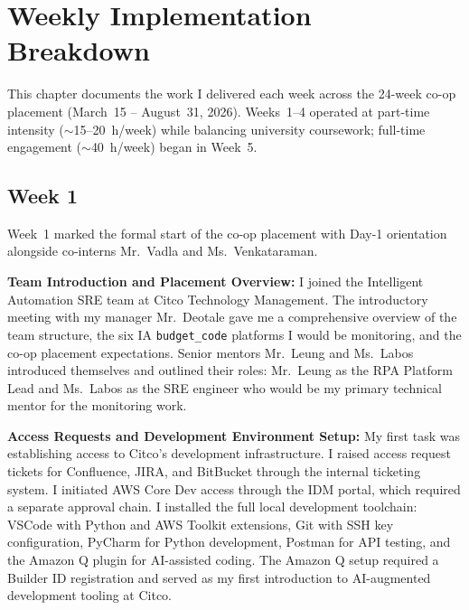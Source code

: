 ﻿%

\chapter{Weekly Implementation Breakdown}
\label{chap:weekly_breakdown}

This chapter documents the work I delivered each week across the 24-week
co-op placement (March~15 -- August~31, 2026). Weeks~1--4 operated at part-time
intensity ($\sim$15--20~h/week) while balancing university coursework;
full-time engagement ($\sim$40~h/week) began in Week~5.


\FloatBarrier

\section{Week 1}
\label{sec:week1}

Week~1 marked the formal start of the co-op placement with Day-1 orientation alongside co-interns Mr.\ Vadla and Ms.\ Venkataraman.

\textbf{Team Introduction and Placement Overview:}
I joined the Intelligent Automation SRE team at Citco Technology Management. The introductory meeting with my manager Mr.\ Deotale gave me a comprehensive overview of the team structure, the six IA \texttt{budget\_code} platforms I would be monitoring, and the co-op placement expectations. Senior mentors Mr.\ Leung and Ms.\ Labos introduced themselves and outlined their roles: Mr.\ Leung as the RPA Platform Lead and Ms.\ Labos as the SRE engineer who would be my primary technical mentor for the monitoring work.

\textbf{Access Requests and Development Environment Setup:}
My first task was establishing access to Citco's development infrastructure. I raised access request tickets for Confluence, JIRA, and BitBucket through the internal ticketing system. I initiated AWS Core Dev access through the IDM portal, which required a separate approval chain. I installed the full local development toolchain: VSCode with Python and AWS Toolkit extensions, Git with SSH key configuration, PyCharm for Python development, Postman for API testing, and the Amazon Q plugin for AI-assisted coding. The Amazon Q setup required a Builder ID registration and served as my first introduction to AI-augmented development tooling at Citco.

